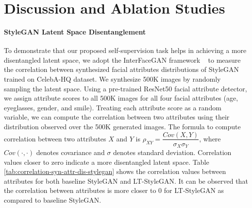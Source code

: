 \documentclass[10pt,twocolumn,letterpaper]{article}
\begin{document}
\begin{table}[t]
\centering
{}
\caption{\footnotesize{Classification accuracy (\%) on separation boundaries in
latent space with respect to different attributes of CelebA-HQ. Attributes are A: Age, E: Eyeglasses, G: Gender, and S: Smiling.}}
\label{tab:interfacegan-table}
\end{table}






\section{Discussion and Ablation Studies}
\paragraph{StyleGAN Latent Space Disentanglement}
\par
To demonstrate that our proposed self-supervision task helps in achieving a more disentangled latent space, we adopt the InterFaceGAN framework ~\cite{interface2020shen} to measure the correlation between synthesized facial attributes distributions of StyleGAN trained on CelebA-HQ dataset. We synthesize 500K images by randomly sampling the latent space. Using a pre-trained ResNet50 facial attribute detector, we assign attribute scores to all 500K images for all four facial attributes (age, eyeglasses, gender, and smile). Treating each attribute score as a random variable, we can compute the correlation between two attributes using their distribution observed over the 500K generated images. The formula to compute correlation between two attributes $X$ and $Y$ is $\rho_{XY} = \dfrac{Cov(X, Y)}{\sigma_X\sigma_Y}$, where $Cov(\cdot,\cdot)$ denotes covariance and $\sigma$ denotes standard deviation. Correlation values closer to zero indicate a more disentangled latent space. Table \ref{tab:correlation-syn-attr-dis-stylegan} shows the correlation values between attributes for both baseline StyleGAN and LT-StyleGAN. It can be observed that the correlation between attributes is more closer to $0$ for LT-StyleGAN as compared to baseline StyleGAN. 
\end{document}
